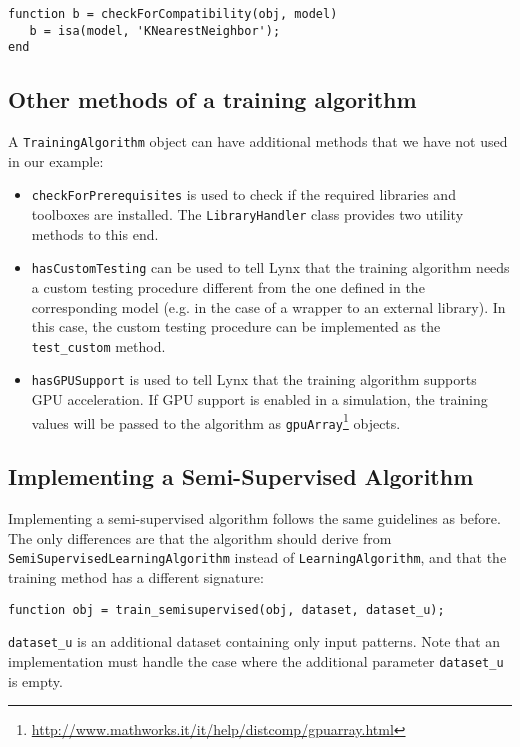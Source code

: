 \begin{lstlisting}
function b = checkForCompatibility(obj, model)
   b = isa(model, 'KNearestNeighbor');
end
\end{lstlisting}

\subsection{Other methods of a training algorithm}

A \verb|TrainingAlgorithm| object can have additional methods that we have not used in our example:

\begin{itemize}
\item \verb|checkForPrerequisites| is used to check if the required libraries and toolboxes are installed. The \verb|LibraryHandler| class provides two utility methods to this end.
\item \verb|hasCustomTesting| can be used to tell Lynx that the training algorithm needs a custom testing procedure different from the one defined in the corresponding model (e.g. in the case of a wrapper to an external library). In this case, the custom testing procedure can be implemented as the \verb|test_custom| method.
\item \verb|hasGPUSupport| is used to tell Lynx that the training algorithm supports GPU acceleration. If GPU support is enabled in a simulation, the training values will be passed to the algorithm as \verb|gpuArray|\footnote{\url{http://www.mathworks.it/it/help/distcomp/gpuarray.html}} objects.
\end{itemize}

\subsection{Implementing a Semi-Supervised Algorithm}

Implementing a semi-supervised algorithm follows the same guidelines as before. The only differences are that the algorithm should derive from \verb|SemiSupervisedLearningAlgorithm| instead of \verb|LearningAlgorithm|, and that the training method has a different signature:

\begin{lstlisting}
function obj = train_semisupervised(obj, dataset, dataset_u);
\end{lstlisting}

\noindent \verb|dataset_u| is an additional dataset containing only input patterns. Note that an implementation must handle the case where the additional parameter \verb|dataset_u| is empty.

